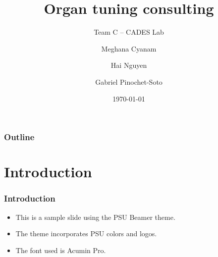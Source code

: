 \documentclass{beamer}
\title{Organ tuning consulting}
\subtitle{Team C -- CADES Lab}
\author[Cyanam, Nguyen, Pinochet-Soto]{Meghana Cyanam \and Hai Nguyen \and Gabriel Pinochet-Soto}
\institute{Portland State University}
\date{\today}
\begin{document}
    {
    \begin{frame}
		\titlepage
	\end{frame}
    }

    \begin{frame}
        \frametitle{Outline}
        \tableofcontents
    \end{frame}

    \section{Introduction}
	\begin{frame}
		\frametitle{Introduction}
		\begin{itemize}
			\item This is a sample slide using the PSU Beamer theme.

			\item The theme incorporates PSU colors and logos.

			\item The font used is Acumin Pro.
		\end{itemize}
	\end{frame}
\end{document}
